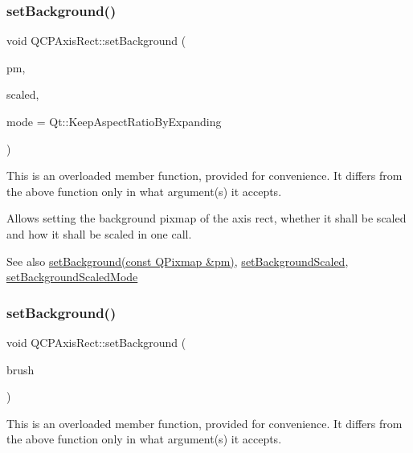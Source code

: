 \subsubsection{\texorpdfstring{set\+Background()}{setBackground()}\hspace{0.1cm}{\footnotesize\ttfamily [2/3]}}
{\footnotesize\ttfamily void Q\+C\+P\+Axis\+Rect\+::set\+Background (\begin{DoxyParamCaption}\item[{const Q\+Pixmap \&}]{pm,  }\item[{bool}]{scaled,  }\item[{Qt\+::\+Aspect\+Ratio\+Mode}]{mode = {\ttfamily Qt\+:\+:KeepAspectRatioByExpanding} }\end{DoxyParamCaption})}

This is an overloaded member function, provided for convenience. It differs from the above function only in what argument(s) it accepts.

Allows setting the background pixmap of the axis rect, whether it shall be scaled and how it shall be scaled in one call.

\begin{DoxySeeAlso}{See also}
\hyperlink{classQCPAxisRect_af615ab5e52b8e0a9a0eff415b6559db5}{set\+Background(const Q\+Pixmap \&pm)}, \hyperlink{classQCPAxisRect_ae6d36c3e0e968ffb991170a018e7b503}{set\+Background\+Scaled}, \hyperlink{classQCPAxisRect_a5ef77ea829c9de7ba248e473f48f7305}{set\+Background\+Scaled\+Mode} 
\end{DoxySeeAlso}
\mbox{\label{classQCPAxisRect_a22a22b8668735438dc06f9a55fe46b33}} 
\subsubsection{\texorpdfstring{set\+Background()}{setBackground()}\hspace{0.1cm}{\footnotesize\ttfamily [3/3]}}
{\footnotesize\ttfamily void Q\+C\+P\+Axis\+Rect\+::set\+Background (\begin{DoxyParamCaption}\item[{const Q\+Brush \&}]{brush }\end{DoxyParamCaption})}

This is an overloaded member function, provided for convenience. It differs from the above function only in what argument(s) it accepts.


